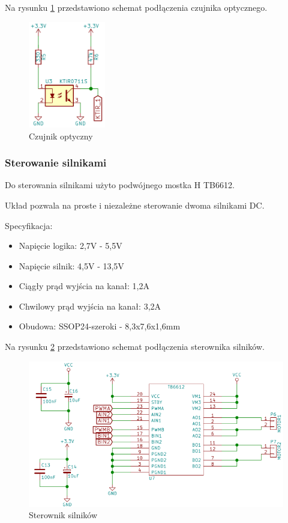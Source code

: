 \documentclass[12pt,a4paper]{article}
\begin{document}
Na rysunku \ref{fig:ktir} przedstawiono schemat podłączenia czujnika optycznego.
%
\begin{figure}[tp]
\centering
\includegraphics[width=0.3\textwidth]{figures/ktir.png}
\caption{Czujnik optyczny \label{fig:ktir}}
\end{figure}


\subsubsection{Sterowanie silnikami}
Do sterowania silnikami użyto podwójnego mostka H TB6612.

Układ pozwala na proste i niezależne sterowanie dwoma silnikami DC.

Specyfikacja:
\begin{itemize}
\item Napięcie logika: 2,7V - 5,5V
\item Napięcie silnik: 4,5V - 13,5V
\item Ciągły prąd wyjścia na kanał: 1,2A
\item Chwilowy prąd wyjścia na kanał: 3,2A
\item Obudowa: SSOP24-szeroki - 8,3x7,6x1,6mm
\end{itemize}

Na rysunku \ref{fig:h} przedstawiono schemat podłączenia sterownika silników.
%
\begin{figure}[tp]
\centering
\includegraphics[width=1\textwidth]{figures/h_and_sup.png}
\caption{Sterownik silników \label{fig:h}}
\end{figure}
\end{document}
